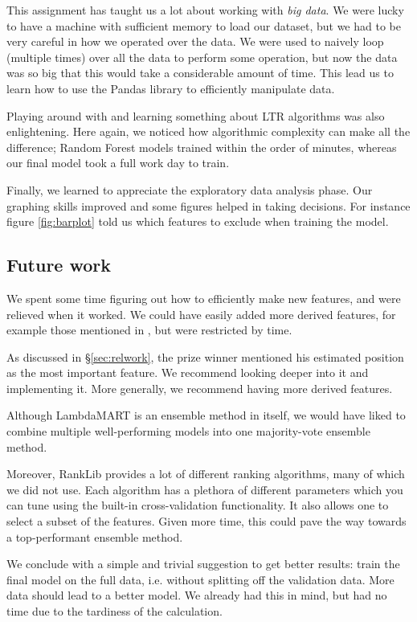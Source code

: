 \documentclass[runningheads,a4paper]{llncs}
\begin{document}
This assignment has taught us a lot about working with \emph{big data}. We were lucky to have a machine with sufficient memory to load our dataset, but we had to be very careful in how we operated over the data. We were used to naively loop (multiple times) over all the data to perform some operation, but now the data was so big that this would take a considerable amount of time. This lead us to learn how to use the Pandas library to efficiently manipulate data.

Playing around with and learning something about LTR algorithms was also enlightening. Here again, we noticed how algorithmic complexity can make all the difference; Random Forest models trained within the order of minutes, whereas our final model took a full work day to train.

Finally, we learned to appreciate the exploratory data analysis phase. Our graphing skills improved and some figures helped in taking decisions. For instance figure \ref{fig:barplot} told us which features to exclude when training the model.

\subsection{Future work}
We spent some time figuring out how to efficiently make new features, and were relieved when it worked. We could have easily added more derived features, for example those mentioned in \cite{bing}, but were restricted by time.

As discussed in \S\ref{sec:relwork}, the prize winner mentioned his estimated position as the most important feature.  We recommend looking deeper into it and implementing it. More generally, we recommend having more derived features.

Although LambdaMART is an ensemble method in itself, we would have liked to combine multiple well-performing models into one majority-vote ensemble method.

Moreover, RankLib provides a lot of different ranking algorithms, many of which we did not use. Each algorithm has a plethora of different parameters which you can tune using the built-in cross-validation functionality. It also allows one to select a subset of the features. Given more time, this could pave the way towards a top-performant ensemble method.

We conclude with a simple and trivial suggestion to get better results: train the final model on the full data, i.e. without splitting off the validation data. More data should lead to a better model. We already had this in mind, but had no time due to the tardiness of the calculation.

\vfill

\begingroup
\let\clearpage\relax


\endgroup
\end{document}
